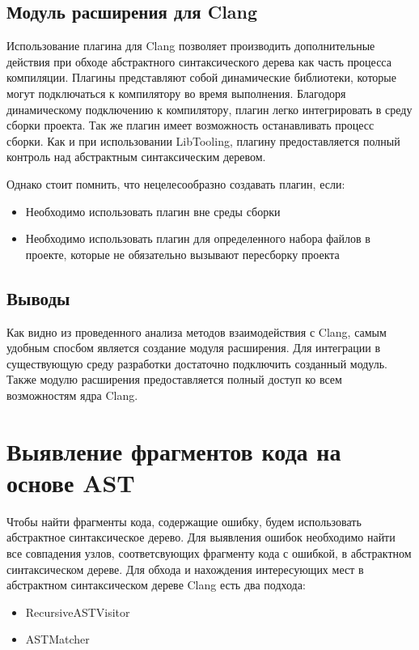\subsection*{Модуль расширения для Clang}
Использование плагина для Clang позволяет производить дополнительные действия при обходе абстрактного 
синтаксического дерева как часть процесса компиляции. Плагины представляют собой динамические
библиотеки, которые могут подключаться к компилятору во время выполнения. Благодоря динамическому подключению 
к компилятору, плагин легко интегрировать в среду сборки проекта. Так же плагин имеет возможность 
останавливать процесс сборки. Как и при использовании LibTooling, плагину предоставляется полный
контроль над абстрактным синтаксическим деревом.
 
Однако стоит помнить, что нецелесообразно создавать плагин, если:
\begin{itemize}
	\item Необходимо использовать плагин вне среды сборки
	\item Необходимо использовать плагин для определенного набора файлов в проекте, которые 
не обязательно вызывают пересборку проекта
\end{itemize}

\subsection*{Выводы}
Как видно из проведенного анализа методов взаимодействия с Clang, самым удобным спосбом является создание
модуля расширения. Для интеграции в существующую среду разработки достаточно подключить созданный модуль.
Также модулю расширения предоставляется полный доступ ко всем возможностям ядра Clang.

\section{Выявление фрагментов кода на основе AST}
Чтобы найти фрагменты кода, содержащие ошибку, будем использовать абстрактное синтаксическое дерево.
Для выявления ошибок необходимо найти все совпадения узлов, соответсвующих фрагменту кода с ошибкой, в
абстрактном синтаксическом дереве. Для обхода и нахождения интересующих мест в абстрактном 
синтаксическом дереве Clang есть два подхода:
\begin{itemize}
	\item RecursiveASTVisitor
	\item ASTMatcher
\end{itemize}

